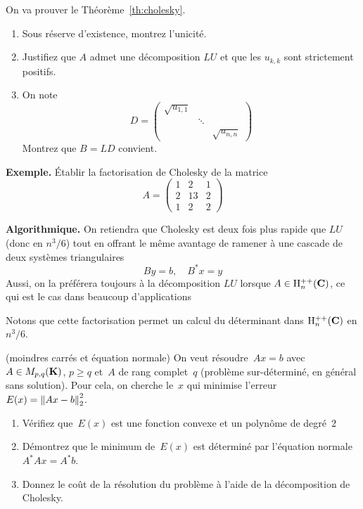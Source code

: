 \begin{exercice}
On va prouver le Théorème~\ref{th:cholesky}.
\begin{enumerate}
\item Sous réserve d'existence, montrez l'unicité.
\item Justifiez que $A$ admet une décomposition $LU$ et que les $u_{k,k}$ sont strictement positifs.
\item On note 
\[
D = \left(\begin{array}{ccc}
\sqrt{u_{1,1}} & & \\
& \ddots & \\
& & \sqrt{u_{n,n}}
\end{array}\right)
\]
Montrez que $B = LD$ convient.
\end{enumerate}
\end{exercice}

{\bf Exemple.}
Établir la factorisation de Cholesky de la matrice
\[
A = \left(\begin{array}{ccc}
1 & 2 & 1 \\
2 & 13 & 2 \\
 1 & 2 & 2
\end{array}\right)
\]

{\bf Algorithmique.}
On retiendra que Cholesky est deux fois plus rapide que $LU$ (donc en
$n^3/6$) tout en offrant le même avantage de ramener à une cascade de deux
systèmes triangulaires
\[
By = b, \quad B^*x = y
\]
Aussi, on la préférera toujours à la décomposition $LU$ lorsque $A \in \mathrm{H}^{++}_n(\mathbf{C})$,
ce qui est le cas dans beaucoup d'applications

Notons que cette factorisation permet un calcul du déterminant dans
$\mathrm{H}^{++}_n(\mathbf{C})$ en $n^3/6$.

\begin{exercice}(moindres carrés et équation normale)
On veut résoudre~$Ax=b$ avec~$A\in M_{p,q}(\mathbf{K})$, $p\ge q$ et~$A$ de rang
complet~$q$ (problème sur-déterminé, en général sans solution).  Pour cela,
on cherche le~$x$ qui minimise l'erreur~$E(x)=\left\|Ax-b\right\|^2_2$.
\begin{enumerate}
	\item Vérifiez que~$E(x)$ est une fonction convexe et un polynôme de
		degré~$2$
	\item Démontrez que le minimum de~$E(x)$ est déterminé par l'équation
		normale~$A^*Ax=A^*b$.
	\item Donnez le coût de la résolution du problème à l'aide de la
		décomposition de Cholesky.
\end{enumerate}
\end{exercice}

